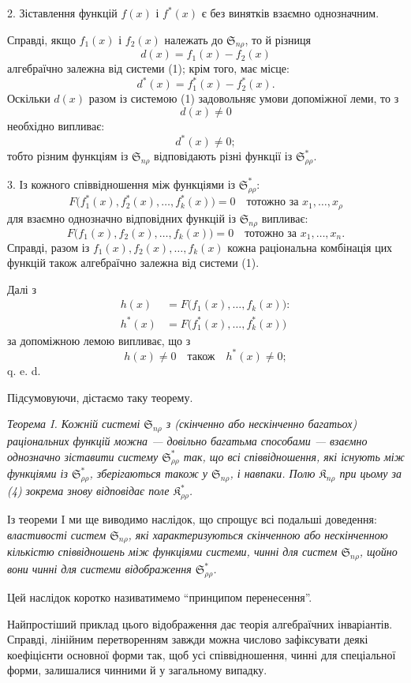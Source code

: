 \documentclass[11pt]{article}
\providecommand{\Kfield}{\mathfrak{K}}
\providecommand{\Ssys}{\mathfrak{S}}
\begin{document}
2. Зіставлення функцій $f(x)$ і $f^*(x)$ є без винятків взаємно однозначним.

Справді, якщо $f_1(x)$ і $f_2(x)$ належать до $\Ssys_{n\rho}$, то й різниця
\[
  d(x)=f_1(x)-f_2(x)
\]
алгебраїчно залежна від системи (1); крім того, має місце:
\[
  d^*(x)=f_1^*(x)-f_2^*(x).
\]
Оскільки $d(x)$ разом із системою (1) задовольняє умови допоміжної леми, то з
\[
  d(x)\ne0
\]
необхідно випливає:
\[
  d^*(x)\ne0;
\]
тобто різним функціям із $\Ssys_{n\rho}$ відповідають різні функції із $\Ssys^*_{\rho\rho}$.

3. Із кожного співвідношення між функціями із $\Ssys^*_{\rho\rho}$:
\[
  F\bigl(f_1^*(x),f_2^*(x),\ldots,f_k^*(x)\bigr)=0
  \quad\text{тотожно за }x_1,\ldots,x_\rho
\]
для взаємно однозначно відповідних функцій із $\Ssys_{n\rho}$ випливає:
\[
  F\bigl(f_1(x),f_2(x),\ldots,f_k(x)\bigr)=0
  \quad\text{тотожно за }x_1,
\ldots,x_n.
\]
Справді, разом із $f_1(x),f_2(x),\ldots,f_k(x)$ кожна раціональна комбінація цих функцій також алгебраїчно залежна від системи (1).

Далі з
\begin{equation}
\begin{aligned}
 h(x)&=F\bigl(f_1(x),\ldots,f_k(x)\bigr):\\
 h^*(x)&=F\bigl(f_1^*(x),\ldots,f_k^*(x)\bigr)
\end{aligned}
\tag{4}
\end{equation}
за допоміжною лемою випливає, що з
\[
  h(x)\ne0\quad\text{також}\quad h^*(x)\ne0;
\]
q. e. d.

Підсумовуючи, дістаємо таку теорему.

{\itshape Теорема I. Кожній системі $\Ssys_{n\rho}$ з (скінченно або нескінченно багатьох) раціональних функцій можна --- довільно багатьма способами --- взаємно однозначно зіставити систему $\Ssys^*_{\rho\rho}$ так, що всі співвідношення, які існують між функціями із $\Ssys^*_{\rho\rho}$, зберігаються також у $\Ssys_{n\rho}$, і навпаки. Полю $\Kfield_{n\rho}$ при цьому за (4) зокрема знову відповідає поле $\Kfield^*_{\rho\rho}$.}

Із теореми I ми ще виводимо наслідок, що спрощує всі подальші доведення: {\itshape властивості систем $\Ssys_{n\rho}$, які характеризуються скінченною або нескінченною кількістю співвідношень між функціями системи, чинні для систем $\Ssys_{n\rho}$, щойно вони чинні для системи відображення $\Ssys^*_{\rho\rho}$.}

Цей наслідок коротко називатимемо ``принципом перенесення''.

\providecommand{\Lsys}{\mathfrak{L}}
\providecommand{\Jdom}{\mathfrak{J}}

\clearpage
Найпростіший приклад цього відображення дає теорія алгебраїчних інваріантів. Справді, лінійним перетворенням завжди можна числово зафіксувати деякі коефіцієнти основної форми так, щоб усі співвідношення, чинні для спеціальної форми, залишалися чинними й у загальному випадку.
\end{document}
